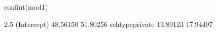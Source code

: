 \begin{Schunk}
\begin{Sinput}
 confint(mod1)
\end{Sinput}
\begin{Soutput}
                  2.5 %   97.5 %
(Intercept)    48.56150 51.80256
schtypeprivate 13.89123 17.94497
\end{Soutput}
\end{Schunk}
